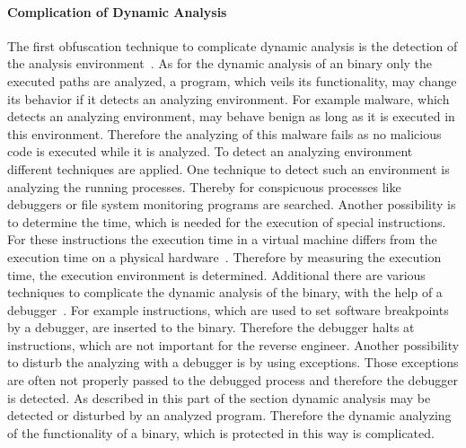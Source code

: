\documentclass[10pt,twoside,a4paper,bibliography=totoc]{scrbook}
\begin{document}
\paragraph*{Complication of Dynamic Analysis}
The first obfuscation technique to complicate dynamic analysis is the detection of
the analysis environment~\cite{dynsurvey}.
As for the dynamic analysis of an binary only the executed paths are analyzed,
a program, which veils its functionality, may change its behavior if it detects 
an analyzing environment.
For example malware, which detects an analyzing environment, may behave benign as 
long as it is executed in this environment.
Therefore the analyzing of this malware fails as no malicious code is executed
while it is analyzed.
To detect an analyzing environment different techniques are applied.
One technique to detect such an environment is analyzing the running processes.
Thereby for conspicuous processes like debuggers or file system monitoring programs are searched.
Another possibility is to determine the time, which is needed for the execution
of special instructions.
For these instructions the  execution time in a virtual machine differs from the 
execution time on a physical hardware~\cite{dyndetect}.
Therefore by measuring the execution time, the execution environment is determined.
Additional there are various techniques to complicate the dynamic analysis 
of the binary, with the help of a debugger~\cite{debugcom}.
For example instructions, which are used to set software breakpoints by a debugger,
are inserted to the binary.
Therefore the debugger halts at instructions, which are not important for the 
reverse engineer.
Another possibility to disturb the analyzing with a debugger is by using 
exceptions. 
Those exceptions are often not properly passed to the debugged process and 
therefore the debugger is detected.
As described in this part of the section dynamic analysis may be detected or
disturbed by an analyzed program. 
Therefore the dynamic analyzing of the functionality of a binary, which is protected in this way 
is complicated.
\end{document}
